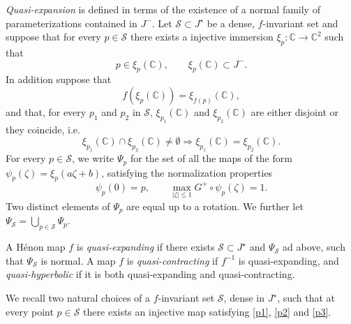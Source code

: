 \documentclass[10pt,a4paper]{article}
\newenvironment{definition}[1][Definition]{\begin{trivlist}
\item[\hskip \labelsep {\bfseries #1}]}{\end{trivlist}}
\begin{document}
\emph{Quasi-expansion} is defined in terms of the existence of a normal family of parameterizations contained in $J^-$. Let $\mathcal S\subset J^\star$ be a dense, $f$-invariant set and suppose that for every $p\in\mathcal S$ there exists a injective immersion $\xi_p:\mathbb C\rightarrow \mathbb C^2$ such that
\begin{equation}
\label{p1}
p\in\xi_p(\mathbb C),\qquad \xi_p(\mathbb C)\subset J^-.
\end{equation}
In addition suppose that
\begin{equation}
\label{p2}
f(\xi_p(\mathbb C))=\xi_{f(p)}(\mathbb C),
\end{equation}
and that, for every $p_1$ and $p_2$ in $\mathcal S$, $\xi_{p_1}(\mathbb C)$ and $\xi_{p_2}(\mathbb C)$ are either disjoint or they coincide, i.e.
\begin{equation}
\label{p3}
\xi_{p_1}(\mathbb C)\cap\xi_{p_2}(\mathbb C)\neq \emptyset\Rightarrow\xi_{p_1}(\mathbb C)=\xi_{p_2}(\mathbb C).
\end{equation}
For every $p\in\mathcal S$, we write $\Psi_p$ for the set of all the maps of the form $\psi_p(\zeta)=\xi_p(a\zeta+b)$, satisfying the normalization properties
\begin{equation}
\label{normalizationprop}
\psi_p(0)=p,\qquad \max_{|\zeta|\leq 1}G^+\circ \psi_p(\zeta)=1.
\end{equation}
Two distinct elements of $\Psi_p$ are equal up to a rotation. We further let $\Psi_{\mathcal S}=\bigcup_{p\in\mathcal S}\Psi_p$.

\begin{definition}
A H\'enon map $f$ is \textit{quasi-expanding} if there exists $\mathcal S\subset J^\star$ and $\Psi_\mathcal S$ ad above, such that $\Psi_\mathcal S$ is normal. A map $f$ is \textit{quasi-contracting} if $f^{-1}$ is quasi-expanding, and \textit{quasi-hyperbolic} if it is both quasi-expanding and quasi-contracting.
\end{definition}

We recall two natural choices of a $f$-invariant set $\mathcal S$, dense in $J^\star$, such that at every point $p\in\mathcal S$ there exists an injective map satisfying  \eqref{p1}, \eqref{p2} and \eqref{p3}.
\end{document}
